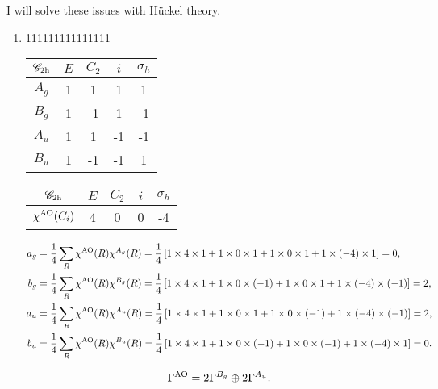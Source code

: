\documentclass[a4paper]{book}
\newcommand{\AO}{{\rm AO}}
\begin{document}
	\begin{solution}

		I will solve these issues with H{\"u}ckel theory.

		\begin{enumerate}[label=(\alph*)]
	
		\item 111111111111111
		
		
		\begin{center}
		\begin{tabular}{ccccc}\hline
	$\mathscr{C}_{\rm 2h}$ & $E$ & $C_2$ & $i$ & $\sigma_h$ \\ \hline
			$A_g$	&	1	&	1	&	1	&	1	\\
			$B_g$	&	1	&	-1	&	1	&	-1	\\
			$A_u$	&	1	&	1	&	-1	&	-1	\\
			$B_u$ 	&	1	&	-1	&	-1	&	1	\\ \hline
		\end{tabular}
		\end{center}
		
		
		\begin{center}
		\begin{tabular}{ccccc}\hline
	$\mathscr{C}_{\rm 2h}$ & $E$ & $C_2$ & $i$ & $\sigma_h$ \\ \hline
	$\chi^{\AO}(C_i)$	&	4	&	0	&	0	&	-4	\\ \hline
		\end{tabular}
		\end{center}
		
		\begin{align*}
		a_g &= \frac{1}{4} \sum_{R} \chi^{\AO}(R) \chi^{A_g}(R) = \frac{1}{4} \left[ 1 \times 4 \times 1 + 1 \times 0 \times 1 + 1 \times 0 \times 1 + 1 \times (-4) \times 1 \right] = 0, \\
		b_g &= \frac{1}{4} \sum_{R} \chi^{\AO}(R) \chi^{B_g}(R) = \frac{1}{4} \left[ 1 \times 4 \times 1 + 1 \times 0 \times (-1) + 1 \times 0 \times 1 + 1 \times (-4) \times (-1) \right] = 2, \\
		a_u &= \frac{1}{4} \sum_{R} \chi^{\AO}(R) \chi^{A_u}(R) = \frac{1}{4} \left[ 1 \times 4 \times 1 + 1 \times 0 \times 1 + 1 \times 0 \times (-1) + 1 \times (-4) \times (-1) \right] = 2, \\
		b_u &= \frac{1}{4} \sum_{R} \chi^{\AO}(R) \chi^{B_u}(R) = \frac{1}{4} \left[ 1 \times 4 \times 1 + 1 \times 0 \times (-1) + 1 \times 0 \times (-1) + 1 \times (-4) \times 1 \right] = 0.
		\end{align*}
		
		\begin{equation*}
			\Gamma^{\AO} = 2 \Gamma^{B_g} \oplus 2 \Gamma^{A_u}.
		\end{equation*}
		

\end{enumerate}
\end{solution}
\end{document}
